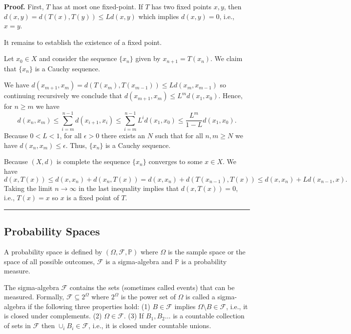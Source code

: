 \documentclass[letter,11pt]{article}
\newenvironment {proof}[1][Proof]{\noindent \textbf {#1.} }{\ \rule {0.5em}{0.5em}}
\begin{document}
\begin{proof} First, $T$ has at most one fixed-point. If $T$ has two fixed points $x,y$, then $d(x,y) = d(T(x),T(y)) \leq Ld(x,y)$ which implies $d(x,y)=0$, i.e., $x=y$. 

    

It remains to establish the existence of a fixed point. 

Let $x_{0} \in X$ and consider the sequence $\{x_{n}\}$ given by $x_{n+1}=T(x_{n})$. We claim that  $\{x_{n}\}$ is a Cauchy sequence.  

We have $d(x_{m+1},x_{m}) = d(T(x_{m}),T(x_{m-1})) \leq L d(x_{m},x_{m-1}) $ so continuing recursively we conclude that $d(x_{m+1},x_{m}) \leq L^{m}d(x_{1},x_{0}) $. Hence, for $n \geq m$ we have 
$$ d(x_{n},x_{m}) \leq \sum _{i=m}^{n-1} d(x_{i+1},x_{i}) \leq \sum _{i=m}^{n-1} L^{i} d(x_{1},x_{0}) \leq \frac{L^{m}}{1-L} d(x_{1},x_{0}).$$
Because $0<L<1$, for all $\epsilon>0$ there exists an $N$ such that for all $n,m \geq N$ we have $d(x_{n},x_{m}) \leq \epsilon$.  Thus, $\{x_{n}\}$ is a Cauchy sequence. 

Because $(X,d)$ is complete the sequence $\{x_{n}\}$ converges to some $x \in X$. We have 
$$ d(x,T(x)) \leq d(x,x_{n}) + d(x_{n},T(x)) = d(x,x_{n}) + d(T(x_{n-1}),T(x)) \leq d(x,x_{n}) + Ld(x_{n-1},x). $$
Taking the limit $n \rightarrow \infty$ in the last inequality implies that $d(x,T(x)) = 0$, i.e., $T(x) = x$ so $x$ is a fixed point of $T$.
\end{proof}

\newpage 

\subsection{Probability Spaces} \label{Sec:Probspace} A probability space is defined by $(\Omega, \mathcal{F}, \mathbb{P})$ where $\Omega$ is the sample space or the space of all possible outcomes, $\mathcal{F}$ is a sigma-algebra and $\mathbb{P}$ is a probability measure.   

The sigma-algebra $\mathcal{F}$ contains the sets (sometimes called events) that can be measured. Formally, $\mathcal{F} \subseteq 2^{\Omega}$ where $2^{\Omega}$ is the power set of $\Omega$  is called a sigma-algebra if the following three properties hold: (1) $B \in \mathcal{F}$ implies $\Omega \setminus B \in \mathcal{F}$, i.e., it is closed under complements. (2) $\Omega \in \mathcal{F}$. (3) If $B_{1},B_{2}\ldots$ is a countable collection of sets in $\mathcal{F}$ then $ \cup _{i} B_{i} \in \mathcal{F}$, i.e., it is closed under countable unions. 
\end{document}
